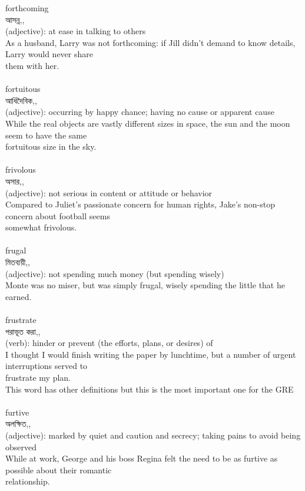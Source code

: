 \documentclass{article}
\begin{document}
{forthcoming}\\
{আসন্ন,,}\\
{(adjective): at ease in talking to others\\As a husband, Larry was not forthcoming: if Jill didn't demand to know details, Larry would never share\\them with her.\\}\\
{fortuitous}\\
{আধিদৈবিক,,}\\
{(adjective): occurring by happy chance; having no cause or apparent cause\\While the real objects are vastly different sizes in space, the sun and the moon seem to have the same\\fortuitous size in the sky.\\}\\
{frivolous}\\
{অসার,,}\\
{(adjective): not serious in content or attitude or behavior\\Compared to Juliet's passionate concern for human rights, Jake's non-stop concern about football seems\\somewhat frivolous.\\}\\
{frugal}\\
{মিতব্যয়ী,,}\\
{(adjective): not spending much money (but spending wisely)\\Monte was no miser, but was simply frugal, wisely spending the little that he earned.\\}\\
{frustrate}\\
{পরাভূত করা,,}\\
{(verb): hinder or prevent (the efforts, plans, or desires) of\\I thought I would finish writing the paper by lunchtime, but a number of urgent interruptions served to\\frustrate my plan.\\This word has other definitions but this is the most important one for the GRE\\}\\
{furtive}\\
{অলক্ষিত,,}\\
{(adjective): marked by quiet and caution and secrecy; taking pains to avoid being observed\\While at work, George and his boss Regina felt the need to be as furtive as possible about their romantic\\relationship.\\}\\
\end{document}
